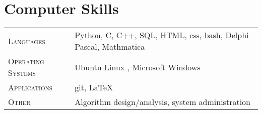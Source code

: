 
\section{Computer Skills}

\begin{tabular}{R{2.5cm}|l}
\textsc{Languages} & Python, C,  C++, SQL, HTML, css, bash, Delphi Pascal, Mathmatica \\
\textsc{Operating Systems} & Ubuntu Linux , Microsoft Windows\\
\textsc{Applications} & git, \LaTeX \\
\textsc{Other} & Algorithm design/analysis, system administration
\end{tabular}

